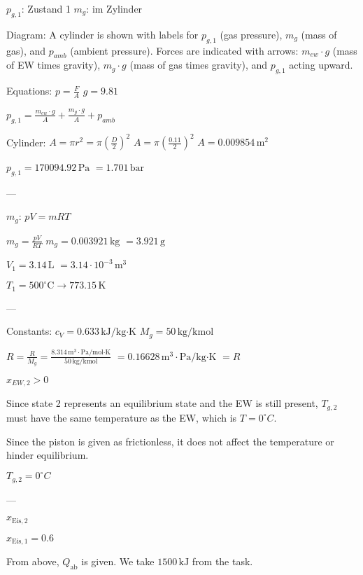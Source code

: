 \( p_{g,1} \): Zustand 1  
\( m_g \): im Zylinder  

Diagram:  
A cylinder is shown with labels for \( p_{g,1} \) (gas pressure), \( m_g \) (mass of gas), and \( p_{amb} \) (ambient pressure). Forces are indicated with arrows: \( m_{ew} \cdot g \) (mass of EW times gravity), \( m_g \cdot g \) (mass of gas times gravity), and \( p_{g,1} \) acting upward.  

Equations:  
\( p = \frac{F}{A} \)  
\( g = 9.81 \)  

\( p_{g,1} = \frac{m_{ew} \cdot g}{A} + \frac{m_g \cdot g}{A} + p_{amb} \)  

Cylinder:  
\( A = \pi r^2 = \pi \left( \frac{D}{2} \right)^2 \)  
\( A = \pi \left( \frac{0.11}{2} \right)^2 \)  
\( A = 0.009854 \, \text{m}^2 \)  

\( p_{g,1} = 170094.92 \, \text{Pa} \)  
\( = 1.701 \, \text{bar} \)  

---

\( m_g \):  
\( pV = mRT \)  

\( m_g = \frac{pV}{RT} \)  
\( m_g = 0.003921 \, \text{kg} \)  
\( = 3.921 \, \text{g} \)  

\( V_1 = 3.14 \, \text{L} \)  
\( = 3.14 \cdot 10^{-3} \, \text{m}^3 \)  

\( T_1 = 500^\circ \text{C} \rightarrow 773.15 \, \text{K} \)  

---

Constants:  
\( c_V = 0.633 \, \text{kJ/kg·K} \)  
\( M_g = 50 \, \text{kg/kmol} \)  

\( R = \frac{R}{M_g} = \frac{8.314 \, \text{m}^3 \cdot \text{Pa}/\text{mol·K}}{50 \, \text{kg/kmol}} \)  
\( = 0.16628 \, \text{m}^3 \cdot \text{Pa}/\text{kg·K} \)  
\( = R \)

\( x_{EW,2} > 0 \)  

Since state 2 represents an equilibrium state and the EW is still present, \( T_{g,2} \) must have the same temperature as the EW, which is \( T = 0^\circ C \).  

Since the piston is given as frictionless, it does not affect the temperature or hinder equilibrium.  

\( T_{g,2} = 0^\circ C \)  

---

\( x_{\text{Eis},2} \)

\( x_{\text{Eis},1} = 0.6 \)

From above, \( Q_{\text{ab}} \) is given. We take \( 1500 \, \text{kJ} \) from the task.

